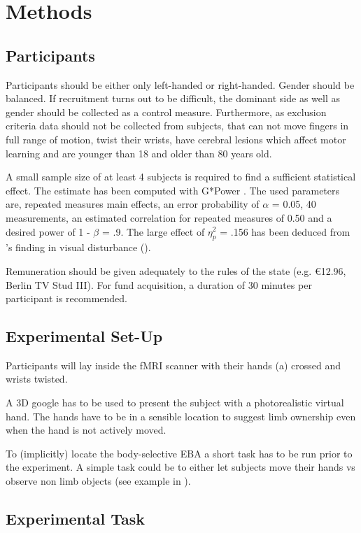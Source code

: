 \documentclass[man]{apa7}
\begin{document}
\section{Methods}
\subsection{Participants}

Participants should be either only left-handed or right-handed. Gender should be balanced. If recruitment turns out to be difficult, the dominant side as well as gender should be collected as a control measure. Furthermore, as exclusion criteria data should not be collected from subjects, that can not move fingers in full range of motion, twist their wrists, have cerebral lesions which affect motor learning and are younger than 18 and older than 80 years old.

A small sample size of at least 4 subjects is required to find a sufficient statistical effect. The estimate has been computed with G*Power \parencite{erdfelder1996gpower}. The used parameters are, repeated measures main effects, an error probability of $\alpha$ = 0.05, 40 measurements, an estimated correlation for repeated measures of 0.50 and a desired power of 1 - $\beta$ = .9. The large effect of $\eta^2_p$ = .156 has been deduced from \citeauthor{Wei2009}'s finding in visual disturbance (\citeyear{Wei2009}).

Remuneration should be given adequately to the rules of the state (e.g. €12.96, Berlin TV Stud III). For fund acquisition, a duration of 30 minutes per participant is recommended.

\subsection{Experimental Set-Up}

Participants will lay inside the fMRI scanner with their hands (a) crossed and wrists twisted.

A 3D google has to be used to present the subject with a photorealistic virtual hand. The hands have to be in a sensible location to suggest limb ownership even when the hand is not actively moved.

To (implicitly) locate the body-selective EBA a short task has to be run prior to the experiment. A simple task could be to either let subjects move their hands vs observe non limb objects (see example in \cite{Limanowski2016}).

\subsection{Experimental Task}
\end{document}
